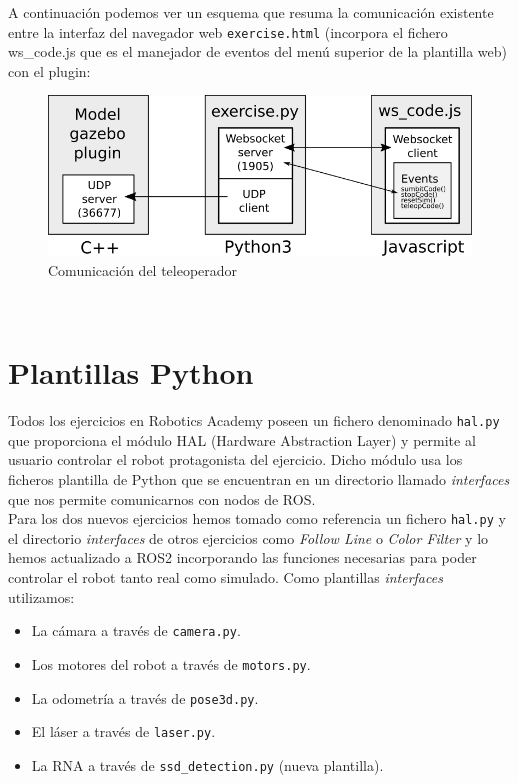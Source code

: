 A continuación podemos ver un esquema que resuma la comunicación existente entre la interfaz del navegador web \texttt{exercise.html} (incorpora el fichero ws\_code.js que es el manejador de eventos del menú superior de la plantilla web) con el plugin:\\

\begin{figure} [H]
  \begin{center}
    \includegraphics[width=15cm]{imagenes/cap5/comunicacion-teleoperador.png}
  \end{center}
  \caption[Comunicación del teleoperador]{Comunicación del teleoperador}
  \label{fig:comunicacion_teleoperador}
\end{figure}\



\section{Plantillas Python}
\label{sec:plantilla_python}

Todos los ejercicios en Robotics Academy poseen un fichero denominado \texttt{hal.py} que proporciona el módulo HAL (Hardware Abstraction Layer) y permite al usuario controlar el robot protagonista del ejercicio. Dicho módulo usa los ficheros plantilla de Python que se encuentran en un directorio llamado \textit{interfaces} que nos permite comunicarnos con nodos de ROS.\\

Para los dos nuevos ejercicios hemos tomado como referencia un fichero \texttt{hal.py} y el directorio \textit{interfaces} de otros ejercicios como \textit{Follow Line} o \textit{Color Filter} y lo hemos actualizado a ROS2 incorporando las funciones necesarias para poder controlar el robot tanto real como simulado. Como plantillas \textit{interfaces} utilizamos:

\begin{itemize}
	\item La cámara a través de \texttt{camera.py}.
	\item Los motores del robot a través de \texttt{motors.py}.
	\item La odometría a través de \texttt{pose3d.py}.
	\item El láser a través de \texttt{laser.py}.
	\item La RNA a través de \texttt{ssd\_detection.py} (nueva plantilla).
\end{itemize}\

